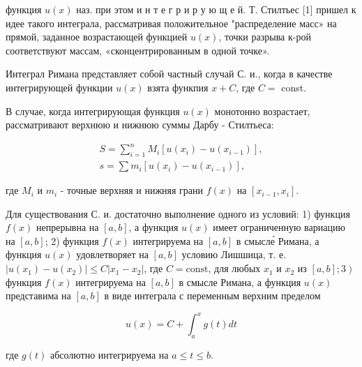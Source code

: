 \documentclass[10pt]{article}
\begin{document}
функция $u(x)$ наз. при этом и н т е г р и р у ю щ е й. Т. Стилтьес [1] пришел к идее такого интеграла, рассматривая положительное "распределение масс» на прямой, заданное возрастающей функцией $u(x)$, точки разрыва к-рой соответствуют массам, «сконцентрированным в одной точке».



Интеграл Римана представляет собой частный случай С. и., когда в качестве интегрирующей функции $u(x)$ взята функпия $x+C$, где $C=$ const.



В случае, когда интегрирующая функция $u(x)$ монотонно возрастает, рассматривают верхнюю и нижнюю суммы Дарбу - Стилтьеса:



\[

\begin{gathered}

S=\sum_{i=1}^{n} M_{i}\left[u\left(x_{i}\right)-u\left(x_{i-1}\right)\right], \\

s=\sum m_{i}\left[u\left(x_{i}\right)-u\left(x_{i-1}\right)\right],

\end{gathered}

\]



где $M_{i}$ и $m_{i}$ - точные верхняя и нижняя грани $f(x)$ на $\left[x_{i-1}, x_{i}\right]$.



Для существования С. и. достаточно выполнение одного из условий: 1) функция $f(x)$ непрерывна на $[a, b]$, а функция $u(x)$ имеет ограниченную вариацию на $[a, b]$; 2) функция $f(x)$ интегрируема на $[a, b]$ в смысле́ Римана, а функция $u(x)$ удовлетворяет на $[a, b]$ условию Лишшица, т. е. $\left|u\left(x_{1}\right)-u\left(x_{2}\right)\right| \leqslant C\left|x_{1}-x_{2}\right|$, где $C=\mathrm{const}$, для любых $x_{1}$ и $x_{2}$ из $\left.[a, b] ; 3\right)$ функция $f(x)$ интегрируема на $[a, b]$ в смысле Римана, а функция $u(x)$ представима на $[a, b]$ в виде интеграла с переменным верхним пределом



\[

u(x)=C+\int_{a}^{x} g(t) d t

\]



где $g(t)$ абсолютно интегрируема на $a \leqslant t \leqslant b$.
\end{document}
